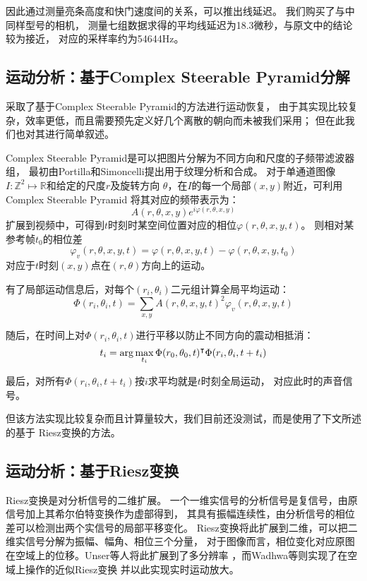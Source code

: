 因此通过测量亮条高度和快门速度间的关系，可以推出线延迟。
我们购买了与\cite{Davis2014VisualMic}中同样型号的相机，
测量七组数据求得的平均线延迟为18.3微秒，与原文中的结论较为接近，
对应的采样率约为54644Hz。

\subsection{运动分析：基于Complex Steerable Pyramid分解}
\cite{Davis2014VisualMic}采取了基于Complex Steerable Pyramid的方法进行运动恢复，
由于其实现比较复杂，效率更低，而且需要预先定义好几个离散的朝向而未被我们采用；
但在此我们也对其进行简单叙述。

Complex Steerable Pyramid是可以把图片分解为不同方向和尺度的子频带滤波器组，
最初由Portilla和Simoncelli提出用于纹理分析和合成\cite{Portilla99}。
对于单通道图像$I: \mathbb{Z}^2 \mapsto \mathbb{R}$和给定的尺度$r$及旋转方向
$\theta$，在$I$的每一个局部$(x, y)$附近，可利用Complex Steerable Pyramid
将其对应的频带表示为：
\begin{equation}
    A(r, \theta, x, y) e^{i\varphi(r, \theta, x, y)}
\end{equation}
扩展到视频中，可得到$t$时刻时某空间位置对应的相位$\varphi(r, \theta, x, y, t)$。
则相对某参考帧$t_0$的相位差
\begin{equation}
    \varphi_v(r, \theta, x, y, t) = \varphi(r, \theta, x, y, t) - 
    \varphi(r, \theta, x, y, t_0)
\end{equation}
对应于$t$时刻$(x, y)$点在$(r, \theta)$方向上的运动。

有了局部运动信息后，对每个$(r_i, \theta_i)$二元组计算全局平均运动：
\begin{equation}
    \Phi(r_i, \theta_i, t) = \sum_{x, y}
    A(r, \theta, x, y, t)^2 \varphi_v(r, \theta, x, y, t)
\end{equation}

随后，在时间上对$\Phi(r_i, \theta_i, t)$进行平移以防止不同方向的震动相抵消：
\begin{equation}
    t_i = \arg\max_{t_i} \Phi(r_0, \theta_0, t)^\intercal\Phi(r_i, \theta_i, t +
    t_i)
\end{equation}

最后，对所有$\Phi(r_i, \theta_i, t + t_i)$按$i$求平均就是$t$时刻全局运动，
对应此时的声音信号。

但该方法实现比较复杂而且计算量较大，我们目前还没测试，而是使用了下文所述的基于
Riesz变换的方法。


\subsection{运动分析：基于Riesz变换}
Riesz变换\cite{felsberg2001monogenic}是对分析信号的二维扩展。
一个一维实信号的分析信号是复信号，由原信号加上其希尔伯特变换作为虚部得到，
其具有振幅连续性，由分析信号的相位差可以检测出两个实信号的局部平移变化。
Riesz变换将此扩展到二维，可以把二维实信号分解为振幅、幅角、相位三个分量，
对于图像而言，相位变化对应原图在空域上的位移。Unser等人将此扩展到了多分辨率
\cite{unser2009multiresolution}，而Wadhwa等则实现了在空域上操作的近似Riesz变换
并以此实现实时运动放大\cite{Wadhwa2014RieszPyramid}。

